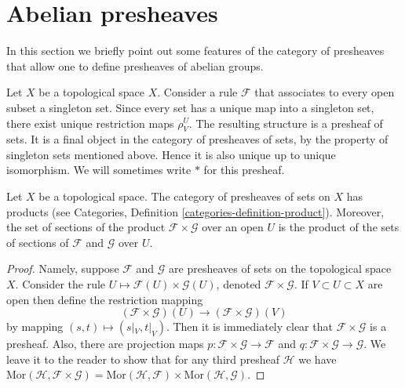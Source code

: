 \section{Abelian presheaves}
\label{section-abelian-presheaves}

\noindent
In this section we briefly point out some features of the
category of presheaves that allow one to define presheaves
of abelian groups.

\begin{example}
\label{example-singleton-presheaf}
Let $X$ be a topological space $X$. Consider a rule $\mathcal{F}$ that
associates to every open subset a singleton set. Since every set
has a unique map into a singleton set, there exist unique restriction
maps $\rho^U_V$. The resulting structure is a presheaf of sets.
It is a final object in the category of presheaves of sets, by the
property of singleton sets mentioned above. Hence it is
also unique up to unique isomorphism. We will sometimes write $*$
for this presheaf.
\end{example}

\begin{lemma}
\label{lemma-product-presheaves}
Let $X$ be a topological space. The category of presheaves of sets
on $X$ has products (see
Categories, Definition \ref{categories-definition-product}).
Moreover, the set of
sections of the product $\mathcal{F} \times \mathcal{G}$
over an open $U$ is the product of the sets of sections of
$\mathcal{F}$ and $\mathcal{G}$ over $U$.
\end{lemma}

\begin{proof}
Namely, suppose $\mathcal{F}$ and $\mathcal{G}$ are
presheaves of sets on the topological space $X$.
Consider the rule $U \mapsto \mathcal{F}(U) \times \mathcal{G}(U)$,
denoted $\mathcal{F}\times \mathcal{G}$. If $V \subset U \subset X$
are open then define the restriction mapping
$$
(\mathcal{F} \times \mathcal{G})(U)
\longrightarrow
(\mathcal{F} \times \mathcal{G})(V)
$$
by mapping $(s, t) \mapsto (s|_V, t|_V)$. Then it is immediately
clear that $\mathcal{F}\times\mathcal{G}$ is a presheaf.
Also, there are projection maps
$p : \mathcal{F}\times\mathcal{G} \to \mathcal{F}$
and
$q : \mathcal{F}\times\mathcal{G} \to \mathcal{G}$.
We leave it to the reader to show that
for any third presheaf $\mathcal{H}$ we have
$\text{Mor}(\mathcal{H}, \mathcal{F}\times \mathcal{G})
= \text{Mor}(\mathcal{H}, \mathcal{F}) \times
\text{Mor}(\mathcal{H}, \mathcal{G})$.
\end{proof}

